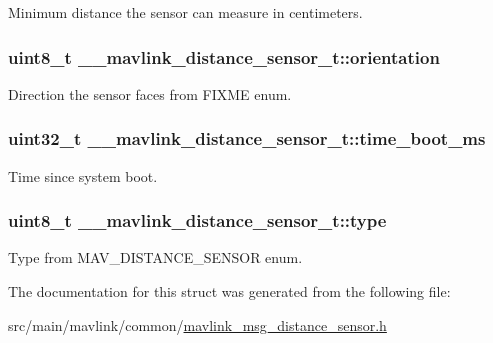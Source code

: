 Minimum distance the sensor can measure in centimeters. 

\hypertarget{struct____mavlink__distance__sensor__t_af074a52389ea13cb4e410a59b1867303}{
\subsubsection[{orientation}]{\setlength{\rightskip}{0pt plus 5cm}uint8\+\_\+t \+\_\+\+\_\+mavlink\+\_\+distance\+\_\+sensor\+\_\+t\+::orientation}}\label{struct____mavlink__distance__sensor__t_af074a52389ea13cb4e410a59b1867303}


Direction the sensor faces from F\+I\+X\+M\+E enum. 

\hypertarget{struct____mavlink__distance__sensor__t_a8dbd24433a8cb2c08e0d3675bd99476a}{
\subsubsection[{time\+\_\+boot\+\_\+ms}]{\setlength{\rightskip}{0pt plus 5cm}uint32\+\_\+t \+\_\+\+\_\+mavlink\+\_\+distance\+\_\+sensor\+\_\+t\+::time\+\_\+boot\+\_\+ms}}\label{struct____mavlink__distance__sensor__t_a8dbd24433a8cb2c08e0d3675bd99476a}


Time since system boot. 

\hypertarget{struct____mavlink__distance__sensor__t_a8381164d6c466b323c9bf3d07d2a7d82}{
\subsubsection[{type}]{\setlength{\rightskip}{0pt plus 5cm}uint8\+\_\+t \+\_\+\+\_\+mavlink\+\_\+distance\+\_\+sensor\+\_\+t\+::type}}\label{struct____mavlink__distance__sensor__t_a8381164d6c466b323c9bf3d07d2a7d82}


Type from M\+A\+V\+\_\+\+D\+I\+S\+T\+A\+N\+C\+E\+\_\+\+S\+E\+N\+S\+O\+R enum. 



The documentation for this struct was generated from the following file\+:\begin{DoxyCompactItemize}
\item 
src/main/mavlink/common/\hyperlink{mavlink__msg__distance__sensor_8h}{mavlink\+\_\+msg\+\_\+distance\+\_\+sensor.\+h}\end{DoxyCompactItemize}
